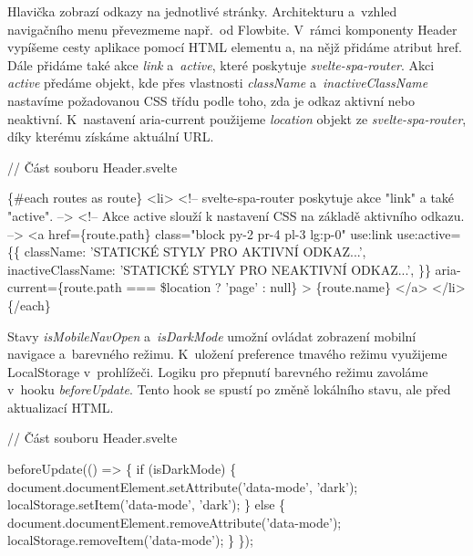 Hlavička zobrazí odkazy na jednotlivé stránky. Architekturu a~vzhled navigačního menu převezmeme např.~od Flowbite. 
V~rámci komponenty Header vypíšeme cesty aplikace pomocí HTML elementu a, na nějž přidáme atribut href. 
Dále přidáme také akce \emph{link} a~\emph{active}, které poskytuje \emph{svelte-spa-router}. 
Akci \emph{active} předáme objekt, kde přes vlastnosti \emph{className} a~\emph{inactiveClassName} nastavíme požadovanou CSS třídu podle toho, zda je odkaz aktivní nebo neaktivní. 
K~nastavení aria-current použijeme \emph{location} objekt ze \emph{svelte-spa-router}, díky kterému získáme aktuální URL.

\begin{prog}
// Část souboru Header.svelte

\{#each routes as route\}
  <li>
    <!-- svelte-spa-router poskytuje akce "link" a také "active". -->
    <!-- Akce active slouží k nastavení CSS na základě aktivního odkazu. -->
    <a
      href=\{route.path\}
      class="block py-2 pr-4 pl-3 lg:p-0"
      use:link
      use:active=\{\{
        className: 'STATICKÉ STYLY PRO AKTIVNÍ ODKAZ...',
        inactiveClassName: 'STATICKÉ STYLY PRO NEAKTIVNÍ ODKAZ...',
      \}\}
      aria-current=\{route.path === \$location ? 'page' : null\}
    >
      \{route.name\}
    </a>
  </li>
\{/each\}
\end{prog}

Stavy \emph{isMobileNavOpen} a~\emph{isDarkMode} umožní ovládat zobrazení mobilní navigace a~barevného režimu. K~uložení preference tmavého režimu využijeme LocalStorage v~prohlížeči. 
Logiku pro přepnutí barevného režimu zavoláme v~hooku \emph{beforeUpdate}. Tento hook se spustí po změně lokálního stavu, ale před aktualizací HTML.

\begin{prog}
// Část souboru Header.svelte

beforeUpdate(() => \{
  if (isDarkMode) \{
    document.documentElement.setAttribute('data-mode', 'dark');
    localStorage.setItem('data-mode', 'dark');
  \} else \{
    document.documentElement.removeAttribute('data-mode');
    localStorage.removeItem('data-mode');
  \}
\});
\end{prog}